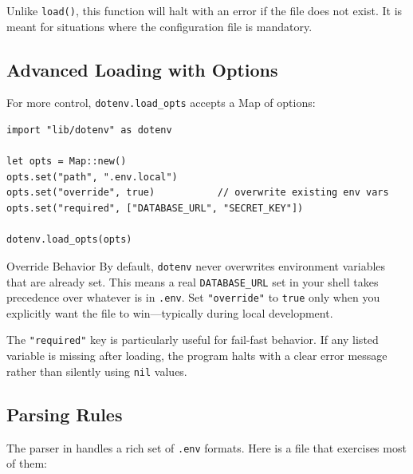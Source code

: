 Unlike \lstinline|load()|, this function will halt with an error if the file does not exist.
It is meant for situations where the configuration file is mandatory.

\subsection{Advanced Loading with Options}\label{sec:dotenv-load-opts}


For more control, \lstinline|dotenv.load_opts| accepts a Map of options:

\begin{lstlisting}[language=Lattice, caption={Loading with options}]
import "lib/dotenv" as dotenv

let opts = Map::new()
opts.set("path", ".env.local")
opts.set("override", true)           // overwrite existing env vars
opts.set("required", ["DATABASE_URL", "SECRET_KEY"])

dotenv.load_opts(opts)
\end{lstlisting}

\begin{notebox}{Override Behavior}
By default, \lstinline|dotenv| never overwrites environment variables that are already set.
This means a real \lstinline|DATABASE_URL| set in your shell takes precedence over whatever is in \texttt{.env}.
Set \lstinline|"override"| to \lstinline|true| only when you explicitly want the file to win---typically during local development.
\end{notebox}

The \lstinline|"required"| key is particularly useful for fail-fast behavior.
If any listed variable is missing after loading, the program halts with a clear error message rather than silently using \lstinline|nil| values.

\subsection{Parsing Rules}\label{sec:dotenv-parsing-rules}


The parser in  handles a rich set of \texttt{.env} formats.
Here is a file that exercises most of them:

